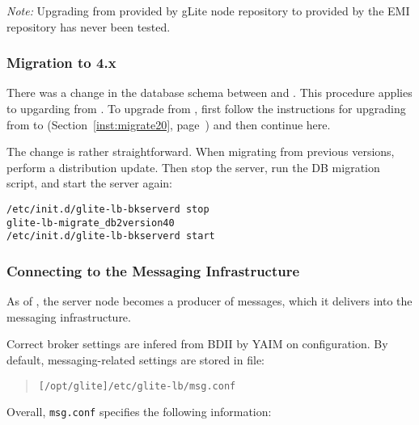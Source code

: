 \emph{Note:} Upgrading from  provided by gLite \LB node repository to  provided by the EMI repository has never been tested.

\subsubsection{Migration to \LB 4.x}
\label{inst:migrate40}
There was a change in the database schema between  and . This procedure applies to upgarding from . To upgrade from , first follow the instructions for upgrading from  to  (Section~\ref{inst:migrate20}, page~\pageref{inst:migrate20}) and then continue here.

The change is rather straightforward. When migrating from previous versions, perform a distribution update. Then stop the \LB server, run the DB migration script, and start the \LB server again:

\begin{verbatim}
/etc/init.d/glite-lb-bkserverd stop
glite-lb-migrate_db2version40
/etc/init.d/glite-lb-bkserverd start
\end{verbatim}


\subsubsection{Connecting to the Messaging Infrastructure}
\label{inst:messaging}

As of , the \LB server node becomes a producer of messages, which it delivers into the messaging infrastructure.

Correct broker settings are infered from BDII by YAIM on configuration. By default, messaging-related settings are stored in file:

  \begin{quote}
	\begin{verbatim}
[/opt/glite]/etc/glite-lb/msg.conf
	\end{verbatim}
  \end{quote}

Overall, \texttt{msg.conf} specifies the following information:

